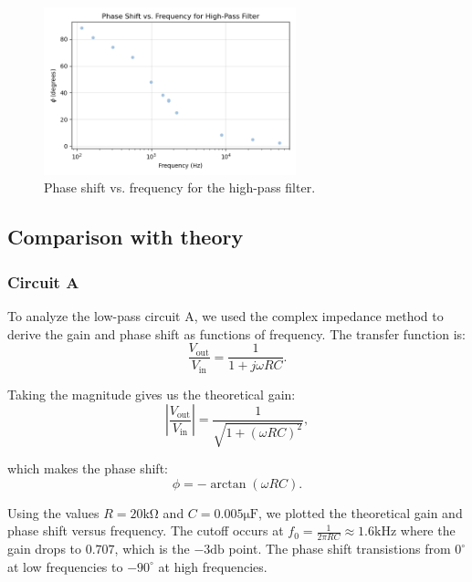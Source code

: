 \documentclass{article}
\begin{document}
\begin{figure}[H]
    \centering
    \includegraphics[width=0.65\textwidth]{2.2.cphase.png}
    \caption{Phase shift vs. frequency for the high-pass filter.}
    \label{fig:phase_highpass}
\end{figure}


\subsection{Comparison with theory}

\subsubsection{Circuit A}

To analyze the low-pass circuit A, we used the complex impedance method to
derive the gain and phase shift as functions of frequency. The transfer
function is:
\begin{equation}
    \frac{V_\text{out}}{V_\text{in}}=\frac{1}{1+j\omega RC}.
\end{equation}

\noindent Taking the magnitude gives us the theoretical gain:
\begin{equation}
    \left|\frac{V_\text{out}}{V_\text{in}}\right|=\frac{1}{\sqrt{1+(\omega RC)^2}},
\end{equation}

\noindent which makes the phase shift:
\begin{equation}
    \phi=-\arctan(\omega RC).
\end{equation}

\noindent Using the values $R=20\si{\kilo\ohm}$ and $C=0.005\si{\micro\farad}$, 
we plotted the theoretical gain and phase shift versus frequency. The cutoff
occurs at $f_0=\frac{1}{2\pi RC}\approx 1.6\si{\kilo\hertz}$ where the gain drops
to $0.707$, which is the $-3\si{\decibel}$ point. The phase shift transistions
from $0^\circ$ at low frequencies to $-90^\circ$ at high frequencies.
\end{document}
